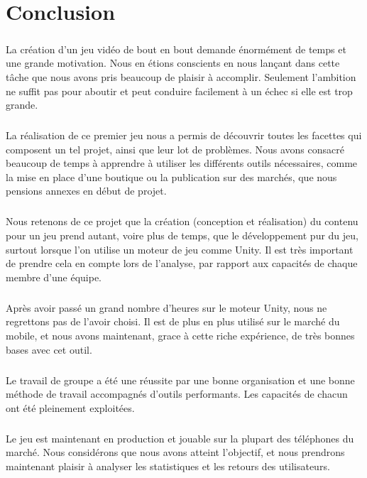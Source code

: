 \chapter{Conclusion}

\paragraph{}
La création d’un jeu vidéo de bout en bout demande énormément de temps et une grande motivation. Nous en étions conscients en nous lançant dans cette tâche que nous avons pris beaucoup de plaisir à accomplir. Seulement l’ambition ne suffit pas pour aboutir et peut conduire facilement à un échec si elle est trop grande.

\paragraph{}
La réalisation de ce premier jeu nous a permis de découvrir toutes les facettes qui composent un tel projet, ainsi que leur lot de problèmes. Nous avons consacré beaucoup de temps à apprendre à utiliser les différents outils nécessaires, comme la mise en place d’une boutique ou la publication sur des marchés, que nous pensions annexes en début de projet.

\paragraph{}
Nous retenons de ce projet que la création (conception et réalisation) du contenu pour un jeu prend autant, voire plus de temps, que le développement pur du jeu, surtout lorsque l'on utilise un moteur de jeu comme Unity. Il est très important de prendre cela en compte lors de l’analyse, par rapport aux capacités de chaque membre d'une équipe.

\paragraph{}
Après avoir passé un grand nombre d'heures sur le moteur Unity, nous ne regrettons pas de l'avoir choisi. Il est de plus en plus utilisé sur le marché du mobile, et nous avons maintenant, grace à cette riche expérience, de très bonnes bases avec cet outil.

\paragraph{}
Le travail de groupe a été une réussite par une bonne organisation et une bonne méthode de travail accompagnés d'outils performants. Les capacités de chacun ont été pleinement exploitées.

\paragraph{}
Le jeu est maintenant en production et jouable sur la plupart des téléphones du marché. Nous considérons que nous avons atteint l'objectif, et nous prendrons maintenant plaisir à analyser les statistiques et les retours des utilisateurs.
